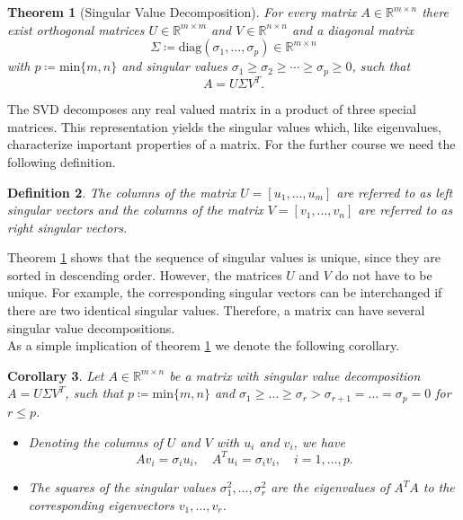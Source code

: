 \documentclass[11pt, a4paper]{article}
\newtheorem{theorem}{Theorem}[section]
\newtheorem{corollary}[theorem]{Corollary}
\newtheorem{definition}[theorem]{Definition}
\newcommand{\R}{\mathds{R}}
\begin{document}
\begin{theorem}[Singular Value Decomposition] \label{thm:svd}
For every matrix $A \in \R^{m \times n}$ there exist orthogonal matrices $U \in \R^{m \times m}$ and $V \in \R^{n \times n}$ and a diagonal matrix 
\[ \Sigma \coloneq \text{diag}(\sigma_1, \dots, \sigma_p) \in \R^{m \times n} \]
with $p \coloneq \text{min} \{ m,n \}$ and singular values $\sigma_1 \geq \sigma_2 \geq \cdots \geq \sigma_p \geq 0$, such that
\[ A = U \Sigma V^T. \]
\end{theorem}

The SVD decomposes any real valued matrix in a product of three special matrices. This representation yields the singular values which, like eigenvalues, characterize important properties of a matrix. For the further course we need the following definition.

\begin{definition}
The columns of the matrix $U = [u_1, \dots, u_m]$ are referred to as left singular vectors and the columns of the matrix $V = [v_1, \dots, v_n]$ are referred to as right singular vectors.
\end{definition}

Theorem \ref{thm:svd} shows that the sequence of singular values is unique, since they are sorted in descending order. However, the matrices $U$ and $V$ do not have to be unique. For example, the corresponding singular vectors can be interchanged if there are two identical singular values. Therefore, a matrix can have several singular value decompositions. \\

As a simple implication of theorem \ref{thm:svd} we denote the following corollary.

\begin{corollary} \label{cor:svd}
Let $A \in \R^{m \times n}$ be a matrix with singular value decomposition $A=U \Sigma V^T$, such that $p \coloneq \text{min}\{m,n\}$ and $\sigma_1 \geq \dots \geq \sigma_r > \sigma_{r+1} = \dots = \sigma_p = 0$ for $r \leq p$.
\begin{itemize}
\item[1.] Denoting the columns of $U$ and $V$ with $u_i$ and $v_i$, we have
\[ A v_i = \sigma_i u_i, \quad A^T u_i = \sigma_i v_i, \quad i=1,\dots,p.\]
\item[2.] The squares of the singular values $\sigma_1^2, \dots, \sigma_r^2$ are the eigenvalues of $A^TA$ to the corresponding eigenvectors $v_1, \dots, v_r$.
\end{itemize}
\end{corollary}
\end{document}
